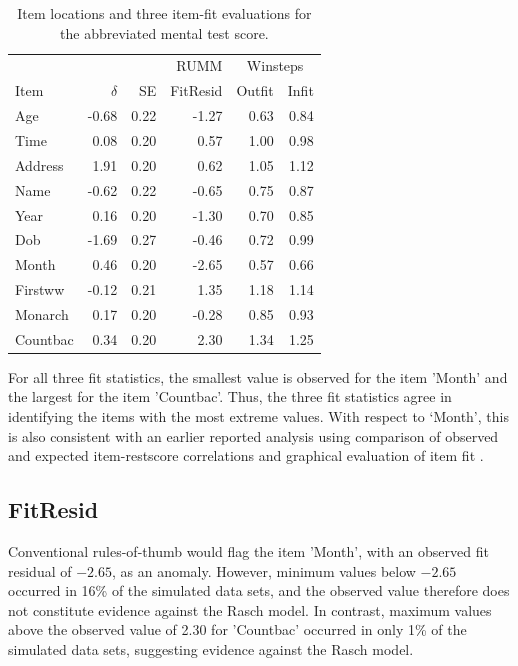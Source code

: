 \documentclass[11pt,a4paper]{article}
\begin{document}
\begin{table}[h!]
\centering
\caption{Item locations and three item-fit evaluations for the abbreviated mental test score.} \label{tab:amtsfit}
\begin{tabular}{lrrrrr}
\\
\toprule
         &          &    & RUMM     & \multicolumn{2}{c}{Winsteps}\\
Item     & $\delta$ & SE & FitResid & Outfit & Infit\\
\midrule
Age      & -0.68 & 0.22 & -1.27 & 0.63 & 0.84 \\
Time     &  0.08 & 0.20 &  0.57 & 1.00 & 0.98 \\
Address  &  1.91 & 0.20 &  0.62 & 1.05 & 1.12 \\
Name     & -0.62 & 0.22 & -0.65 & 0.75 & 0.87 \\
Year     &  0.16 & 0.20 & -1.30 & 0.70 & 0.85 \\
Dob      & -1.69 & 0.27 & -0.46 & 0.72 & 0.99 \\
Month    &  0.46 & 0.20 & -2.65 & 0.57 & 0.66 \\
Firstww  & -0.12 & 0.21 &  1.35 & 1.18 & 1.14 \\
Monarch  &  0.17 & 0.20 & -0.28 & 0.85 & 0.93 \\
Countbac &  0.34 & 0.20 &  2.30 & 1.34 & 1.25 \\
\bottomrule
\end{tabular}
\end{table}

For all three fit statistics, the smallest value is observed for the item 'Month' and the largest for the item 'Countbac'. Thus, the three fit statistics agree in identifying the items with the most extreme values. With respect to `Month', this is also consistent with an earlier reported analysis using comparison of observed and expected item-restscore correlations \cite{Christensen-Kreiner-2013} and graphical evaluation of item fit \cite{Buchardt-Christensen-Jensen-et-al-2023}. 

\subsection{FitResid}

Conventional rules-of-thumb would flag the item 'Month', with an observed fit residual of $-2.65$, as an anomaly. However, minimum values below $-2.65$ occurred in 16\% of the simulated data sets, and the observed value therefore does not constitute evidence against the Rasch model. In contrast, maximum values above the observed value of 2.30 for 'Countbac' occurred in only 1\% of the simulated data sets, suggesting evidence against the Rasch model. 
\end{document}
